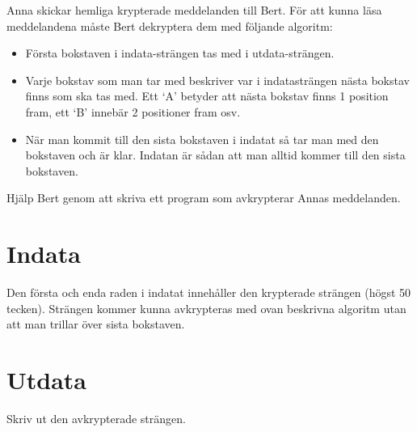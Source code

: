 
Anna skickar hemliga krypterade meddelanden till Bert. För att kunna läsa meddelandena
måste Bert dekryptera dem med följande algoritm:

\begin{itemize}
  \item Första bokstaven i indata-strängen tas med i utdata-strängen.
  \item Varje bokstav som man tar med beskriver var i indatasträngen nästa
    bokstav finns som ska tas med. Ett `A' betyder att nästa bokstav finns 1 position fram, ett
    `B' innebär 2 positioner fram osv.
  \item När man kommit till den sista bokstaven i indatat så tar man med den
    bokstaven och är klar. Indatan är sådan att man alltid kommer till
    den sista bokstaven.
\end{itemize}

Hjälp Bert genom att skriva ett program som avkrypterar Annas meddelanden.

\section*{Indata}

Den första och enda raden i indatat innehåller den krypterade strängen (högst 50 tecken). Strängen
kommer kunna avkrypteras med ovan beskrivna algoritm utan att man trillar över
sista bokstaven. 

\section*{Utdata}

Skriv ut den avkrypterade strängen.
